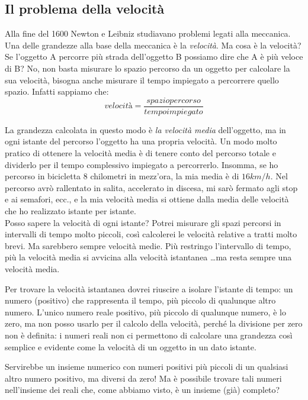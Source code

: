\subsection{Il problema della velocità}
\label{subsec:insnum_velocita}

Alla fine del 1600 Newton e Leibniz studiavano problemi legati alla 
meccanica. 
Una delle grandezze alla base della meccanica è la \emph{velocità}. Ma cosa è 
la velocità? Se l'oggetto A percorre più strada dell'oggetto B possiamo dire 
che A è più veloce di B? No, non basta misurare lo spazio percorso da un 
oggetto per calcolare la sua velocità, bisogna anche misurare il tempo 
impiegato a percorrere quello spazio. Infatti sappiamo che:
\[velocità = \frac{spazio percorso}{tempo impiegato}\]

La grandezza calcolata in questo modo è \emph{la velocità media} 
dell'oggetto, 
ma in ogni istante del percorso l'oggetto ha una propria velocità. 
Un modo molto pratico di ottenere la velocità media è di tenere conto 
del percorso totale e dividerlo per il tempo complessivo impiegato a 
percorrerlo.
Insomma, se ho percorso in bicicletta  \(8\) chilometri in mezz'ora, la mia 
media è 
di  \(16 km/h\). Nel percorso avrò rallentato in salita, accelerato in 
discesa, 
mi sarò fermato agli stop e ai semafori, ecc., e la mia velocità media si 
ottiene
dalla media delle velocità che ho realizzato istante per istante.\\
Posso sapere la velocità di ogni istante? Potrei misurare gli spazi percorsi 
in  
intervalli di tempo molto piccoli, così calcolerei le velocità relative a 
tratti 
molto brevi. Ma sarebbero sempre velocità medie. Più 
restringo l'intervallo di tempo, più la velocità media si avvicina alla 
velocità istantanea \dots ma resta sempre una velocità media.

Per trovare la velocità istantanea dovrei riuscire a isolare l'istante di 
tempo:
un numero (positivo) che rappresenta il tempo, più piccolo di qualunque altro 
numero.
L'unico numero reale positivo, più piccolo di qualunque numero, è lo zero, ma 
non posso
usarlo per il calcolo della velocità, perché la divisione per 
zero non è definita: i numeri reali non ci permettono di calcolare una 
grandezza così semplice e evidente come la velocità di un oggetto in un dato 
istante.

Servirebbe un insieme numerico con numeri positivi più piccoli di un 
qualsiasi altro numero positivo, ma diversi da zero! Ma è possibile 
trovare tali numeri nell'insieme dei reali che, come abbiamo visto, 
è un insieme (già) completo?

